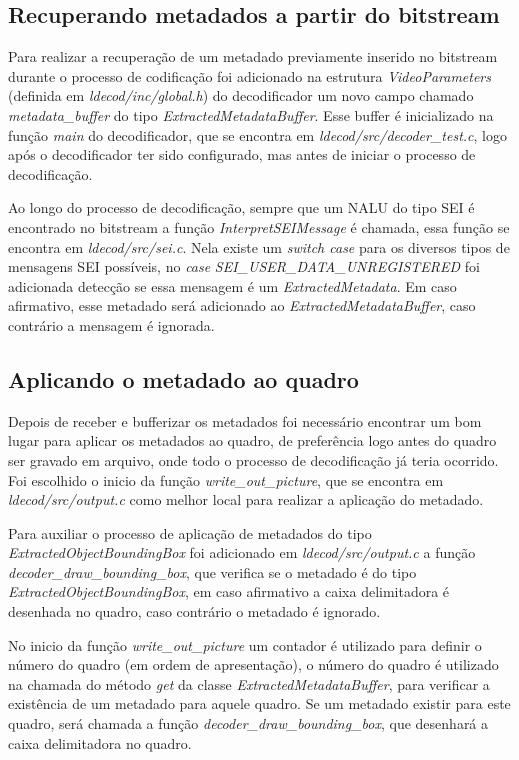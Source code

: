 \subsection{ Recuperando metadados a partir do bitstream }


Para realizar a recuperação de um metadado previamente inserido no bitstream durante o processo de codificação foi adicionado na estrutura \textit{VideoParameters} (definida em \textit{ldecod/inc/global.h}) do decodificador um novo campo chamado \textit{metadata\_buffer} do tipo \textit{ExtractedMetadataBuffer}. Esse buffer é inicializado na função \textit{main} do decodificador, que se encontra em \textit{ldecod/src/decoder\_test.c}, logo após o decodificador ter sido configurado, mas antes de iniciar o processo de decodificação.

Ao longo do processo de decodificação, sempre que um NALU do tipo SEI é encontrado no bitstream a função \textit{InterpretSEIMessage} é chamada, essa função se encontra em \textit{ldecod/src/sei.c}. Nela existe um \textit{switch case} para os diversos tipos de mensagens SEI possíveis, no \textit{case} \textit{SEI\_USER\_DATA\_UNREGISTERED} foi adicionada detecção se essa mensagem é um \textit{ExtractedMetadata}. Em caso afirmativo, esse metadado será adicionado ao \textit{ExtractedMetadataBuffer}, caso contrário a mensagem é ignorada.


\subsection{ Aplicando o metadado ao quadro }


Depois de receber e bufferizar os metadados foi necessário encontrar um bom lugar para aplicar os metadados ao quadro, de preferência logo antes do quadro ser gravado em arquivo, onde todo o processo de decodificação já teria ocorrido. Foi escolhido o inicio da função \textit{write\_out\_picture}, que se encontra em \textit{ldecod/src/output.c} como melhor local para realizar a aplicação do metadado.

Para auxiliar o processo de aplicação de metadados do tipo \textit{ExtractedObjectBoundingBox} foi adicionado em \textit{ldecod/src/output.c} a função \textit{decoder\_draw\_bounding\_box}, que verifica se o metadado é do tipo \textit{ExtractedObjectBoundingBox}, em caso afirmativo a caixa delimitadora é desenhada no quadro, caso contrário o metadado é ignorado.

No inicio da função \textit{write\_out\_picture} um contador é utilizado para definir o número do quadro (em ordem de apresentação), o número do quadro é utilizado na chamada do método \textit{get} da classe \textit{ExtractedMetadataBuffer}, para verificar a existência de um metadado para aquele quadro. Se um metadado existir para este quadro, será chamada a função \textit{decoder\_draw\_bounding\_box}, que desenhará a caixa delimitadora no quadro.


